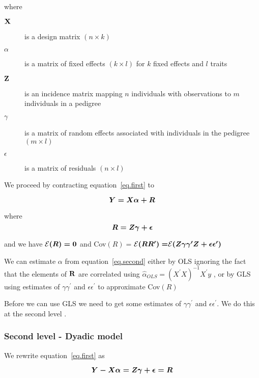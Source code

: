 \documentclass[titlepage]{article}  %
\begin{document}
where 
\begin{description}
\item[$\bf X$] is a design matrix $(n \times k)$
\item[\boldmath $\alpha$] is a matrix of fixed effects $(k \times l)$ for $k$ fixed effects and $l$ traits
\item[$\bf Z$] is an incidence matrix mapping $n$ individuals with observations to $m$ individuals in a pedigree
\item[\boldmath $\gamma$] is a matrix of random effects associated with individuals in the pedigree $(m \times l)$
\item[\boldmath $\epsilon$] is a matrix of residuals $(n \times l)$
\end{description}
 
We proceed by contracting equation~\ref{eq.first} to 

\begin{equation}
\mbox{\boldmath $Y = X\alpha + R$}   \label{eq.second}
\end{equation}

where
\begin{displaymath}
\mbox{\boldmath $ R = Z\gamma + \epsilon$} 
\end{displaymath}

and we have ${\cal E}\mbox{\boldmath $(R) = 0$}$ and Cov\mbox{\boldmath $(R) = $}${\cal E}\mbox{\boldmath $(R R^{\prime}) = $}{\cal E}\mbox{\boldmath $(Z \gamma \gamma^{\prime} Z + \epsilon \epsilon^{\prime})$}$

We can estimate \boldmath $\alpha$ from equation~\ref{eq.second} either by OLS ignoring the fact that the elements of $\bf R$ are correlated using \boldmath $\hat{\alpha}_{OLS} = (X^{\prime}X)^{-1}X^{\prime}y$ , or by GLS using estimates of $\gamma \gamma^{\prime}$ and $\epsilon \epsilon^{\prime}$ to approximate Cov\mbox{\boldmath $(R)$}

Before we can use GLS we need to get some estimates of $\gamma \gamma^{\prime}$ and $\epsilon \epsilon^{\prime}$. We do this at the second level .

\subsubsection{Second level - Dyadic model}
\label{sec:dm}
We  rewrite equation~\ref{eq.first} as 

\begin{equation}
\mbox{\boldmath $Y - X \alpha = Z \gamma + \epsilon = R$}  \label{eq.third}
\end{equation}
\end{document}
